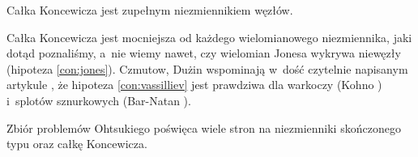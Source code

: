 \begin{conjecture}
    \label{con:vassilliev}
    Całka Koncewicza jest zupełnym niezmiennikiem węzłów.
\end{conjecture}

Całka Koncewicza jest mocniejsza od każdego wielomianowego niezmiennika, jaki dotąd poznaliśmy, a~nie wiemy nawet, czy wielomian Jonesa wykrywa niewęzły (hipoteza \ref{con:jones}).
%
Czmutow, Dużin wspominają w~dość czytelnie napisanym artykule \cite{chmutov05}, że hipoteza \ref{con:vassilliev} jest prawdziwa dla warkoczy (Kohno \cite{kohno87}) i~splotów sznurkowych (Bar-Natan \cite{barnatandror95}).
%
%
%
%
%
%

Zbiór problemów Ohtsukiego \cite[s. 398-444]{ohtsuki02} poświęca wiele stron na niezmienniki skończonego typu oraz całkę Koncewicza.

%

